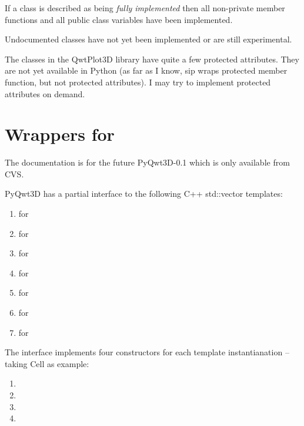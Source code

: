 \documentclass{manual}
\newcommand{\Future}{
  \begin{notice}[warning]
    The documentation is for the future PyQwt3D-0.1 which is only available
    from CVS.
  \end{notice}
}
\begin{document}
If a class is described as being \emph{fully implemented} then all non-private
member functions and all public class variables have been implemented.

Undocumented classes have not yet been implemented or are still experimental.

The classes in the QwtPlot3D library have quite a few protected attributes.
They are not yet available in Python (as far as I know, sip wraps protected
member function, but not protected attributes).
I may try to implement protected attributes on demand.

\section{Wrappers for  \label{wrappers}}

\Future{}

PyQwt3D has a partial interface to the following C++ std::vector templates:
\begin{enumerate}
\item
   for 
\item
   for 
\item
   for 
\item
   for 
\item
   for 
\item
   for 
\item
   for 
\end{enumerate}

The interface implements four constructors for each template instantianation --
taking Cell as example:
\begin{enumerate}
\item
\item
\item
\item
\end{enumerate}
\end{document}
